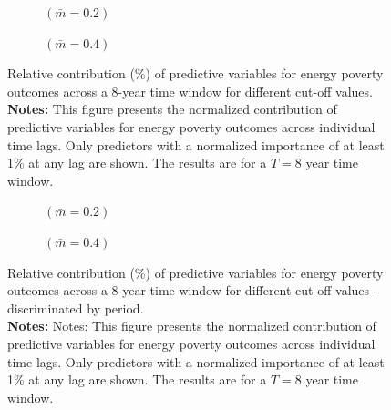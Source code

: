 \documentclass[preprint,authoryear,12pt]{elsarticle}
\begin{document}
\begin{figure}
     \centering
     \begin{subfigure}[b]{0.45\textwidth}
         \centering
         \resizebox{\textwidth}{!}{}
         \caption{$(\bar{m}=0.2)$}
     \end{subfigure}
     \hfill
     \begin{subfigure}[b]{0.45\textwidth}
         \centering
         \resizebox{\textwidth}{!}{}
         \caption{$(\bar{m}=0.4)$}
     \end{subfigure}
    \caption{Relative contribution (\%) of predictive variables for energy poverty outcomes across a 8-year time window for different cut-off values.\\
    {\bf Notes:}  This figure presents the normalized contribution of predictive variables for energy poverty outcomes across individual time lags. Only predictors with a normalized importance of at least 1\% at any lag are shown. The results are for a $T=8$ year time window.}
\label{fig:figure7}
\end{figure}

\begin{figure}
     \centering
     \begin{subfigure}[b]{0.45\textwidth}
         \centering
         \resizebox{\textwidth}{!}{}
         \caption{$(\bar{m}=0.2)$}
     \end{subfigure}
     \hfill
     \begin{subfigure}[b]{0.45\textwidth}
         \centering
         \resizebox{\textwidth}{!}{}
         \caption{$(\bar{m}=0.4)$}
     \end{subfigure}
    \caption{Relative contribution (\%) of predictive variables for energy poverty outcomes across a 8-year time window for different cut-off values - discriminated by period.\\
    {\bf Notes:}  Notes: This figure presents the normalized contribution of predictive variables for energy poverty outcomes across individual time lags. Only predictors with a normalized importance of at least 1\% at any lag are shown. The results are for a $T=8$ year time window.
    }
    \label{fig:figure8}
\end{figure}
\end{document}
